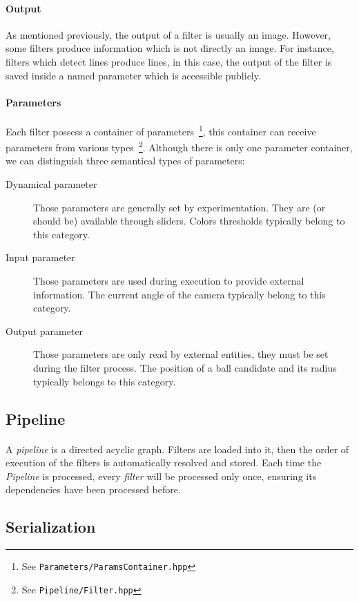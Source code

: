 \documentclass[a4paper,12pt]{article}
\begin{document}
\paragraph{Output}
As mentioned previously, the output of a filter is usually an image.
However, some filters produce information which is not directly an image.
For instance, filters which detect lines produce lines, in this case, the
output of the filter is saved inside a named parameter which is accessible
publicly.

\paragraph{Parameters}
Each filter possess a container of parameters~\footnote{See
  \verb!Parameters/ParamsContainer.hpp!}, this container can receive
parameters from various types~\footnote{See \verb!Pipeline/Filter.hpp!}.
Although there is only one parameter container, we can distinguish three
semantical types of parameters:
\begin{description}
\item[Dynamical parameter] Those parameters are generally set by
  experimentation. They are (or should be) available through sliders.
  Colors thresholds typically belong to this category.
\item[Input parameter] Those parameters are used during execution to provide
  external information. The current angle of the camera typically belong
  to this category.
\item[Output parameter] Those parameters are only read by external entities,
  they must be set during the filter process. The position of a ball candidate
  and its radius typically belongs to this category.
\end{description}

\subsection{Pipeline}
\paragraph{}
A \emph{pipeline} is a directed acyclic graph. Filters are loaded into it,
then the order of execution of the filters is automatically resolved and
stored. Each time the \emph{Pipeline} is processed, every \emph{filter}
will be processed only once, ensuring its dependencies have been
processed before.

\subsection{Serialization}
\end{document}
